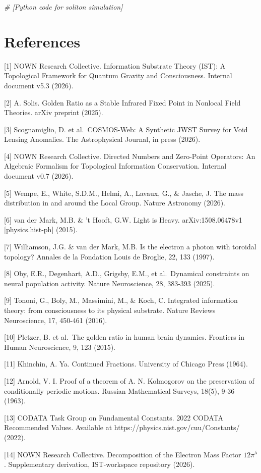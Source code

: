 \documentclass[
  11pt,
]{article}
\newenvironment{Shaded}{}{}
\newcommand{\CommentTok}[1]{\textcolor[rgb]{0.38,0.63,0.69}{\textit{#1}}}
\begin{document}
\begin{Shaded}
\begin{Highlighting}[]
\CommentTok{\# [Python code for soliton simulation]}
\end{Highlighting}
\end{Shaded}

\section{References}\label{references}

{[}1{]} NOWN Research Collective. Information Substrate Theory (IST): A
Topological Framework for Quantum Gravity and Consciousness. Internal
document v5.3 (2026).

{[}2{]} A. Solis. Golden Ratio as a Stable Infrared Fixed Point in
Nonlocal Field Theories. arXiv preprint (2025).

{[}3{]} Scognamiglio, D. et al.~COSMOS-Web: A Synthetic JWST Survey for
Void Lensing Anomalies. The Astrophysical Journal, in press (2026).

{[}4{]} NOWN Research Collective. Directed Numbers and Zero-Point
Operators: An Algebraic Formalism for Topological Information
Conservation. Internal document v0.7 (2026).

{[}5{]} Wempe, E., White, S.D.M., Helmi, A., Lavaux, G., \& Jasche, J.
The mass distribution in and around the Local Group. Nature Astronomy
(2026).

{[}6{]} van der Mark, M.B. \& 't Hooft, G.W. Light is Heavy.
arXiv:1508.06478v1 {[}physics.hist-ph{]} (2015).

{[}7{]} Williamson, J.G. \& van der Mark, M.B. Is the electron a photon
with toroidal topology? Annales de la Fondation Louis de Broglie, 22,
133 (1997).

{[}8{]} Oby, E.R., Degenhart, A.D., Grigsby, E.M., et al.~Dynamical
constraints on neural population activity. Nature Neuroscience, 28,
383-393 (2025).

{[}9{]} Tononi, G., Boly, M., Massimini, M., \& Koch, C. Integrated
information theory: from consciousness to its physical substrate. Nature
Reviews Neuroscience, 17, 450-461 (2016).

{[}10{]} Pletzer, B. et al.~The golden ratio in human brain dynamics.
Frontiers in Human Neuroscience, 9, 123 (2015).

{[}11{]} Khinchin, A. Ya. Continued Fractions. University of Chicago
Press (1964).

{[}12{]} Arnold, V. I. Proof of a theorem of A. N. Kolmogorov on the
preservation of conditionally periodic motions. Russian Mathematical
Surveys, 18(5), 9-36 (1963).

{[}13{]} CODATA Task Group on Fundamental Constants. 2022 CODATA
Recommended Values. Available at https://physics.nist.gov/cuu/Constants/
(2022).

{[}14{]} NOWN Research Collective. Decomposition of the Electron Mass
Factor \(12\pi^5\). Supplementary derivation, IST-workspace repository
(2026).
\end{document}
